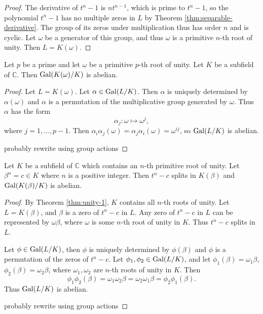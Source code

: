 \begin{proof}
	The derivative of $t^n-1$ is $n t^{n-1}$, which is prime to $t^n-1$, so the polynomial $t^n-1$ has no multiple zeros in $L$ by Theorem \ref{thm:separable-derivative}. The group of its zeros under multiplication thus has order $n$ and is cyclic. Let $\omega$ be a generator of this group, and thus $\omega$ is a primitive $n$-th root of unity. Then $L=K(\omega)$. 
\end{proof}




\begin{theorem} \label{thm:radical-1}
	Let $p$ be a prime and let $\omega$ be a primitive $p$-th root of unity. Let $K$ be a subfield of $\mathbb C$. Then $\operatorname{Gal}(K(\omega) / K)$ is abelian.
\end{theorem}
\begin{proof}
	Let $L = K(\omega)$.  Let $\alpha \in \operatorname{Gal}(L / K)$. Then $\alpha$ is uniquely determined by $\alpha(\omega)$ and $\alpha$ is a permutation of the multiplicative group generated by $\omega$. Thus $\alpha$ has the form
	$$
	\alpha_j: \omega \mapsto \omega^j,
	$$
	where $j=1,\dots,p-1$. Then $\alpha_i \alpha_j (\omega) = \alpha_j \alpha_i (\omega) = \omega^{i j}$, so $ \operatorname{Gal}(L / K)$ is abelian.
	
	\TODO probably rewrite using group actions
\end{proof}

\begin{theorem} \label{thm:radical-2}
	Let $K$ be a subfield of $\mathbb{C}$ which contains an $n$-th primitive root of unity. Let $\beta^n = c \in K $ where $n$ is a positive integer. Then $t^n - c$ splits in $K(\beta)$ and $\operatorname{Gal}(K(\beta) / K)$ is abelian.
\end{theorem}

\begin{proof}
	By Theorem \ref{thm:unity-1}, $K$ contains all $n$-th roots of unity. Let $L = K(\beta)$, and $\beta$ is a zero of $t^n-c$ in $L$. Any zero of $t^n-c$ in $L$ can be represented by $\omega \beta$, where $\omega$ is some $n$-th root of unity in $K$. Thus $t^n - c$ splits in $L$.  
	
	Let $\phi \in \operatorname{Gal}(L / K)$, then $\phi$ is uniquely determined by $\phi(\beta)$ and $\phi$ is a permutation of the zeros of $t^n - c$. Let $\phi_1, \phi_2 \in \operatorname{Gal}(L / K)$, and let $\phi_1(\beta) = \omega_1\beta$, $\phi_2(\beta) = \omega_2\beta$, where $\omega_1, \omega_2$ are $n$-th roots of unity in $K$. Then
	$$
	\phi_1 \phi_2(\beta)=\omega_1 \omega_2 \beta=\omega_2 \omega_1  \beta=\phi_2 \phi_1(\beta).
	$$
	Thus $\operatorname{Gal}(L / K)$ is abelian.
	
	\TODO probably rewrite using group actions
\end{proof}

